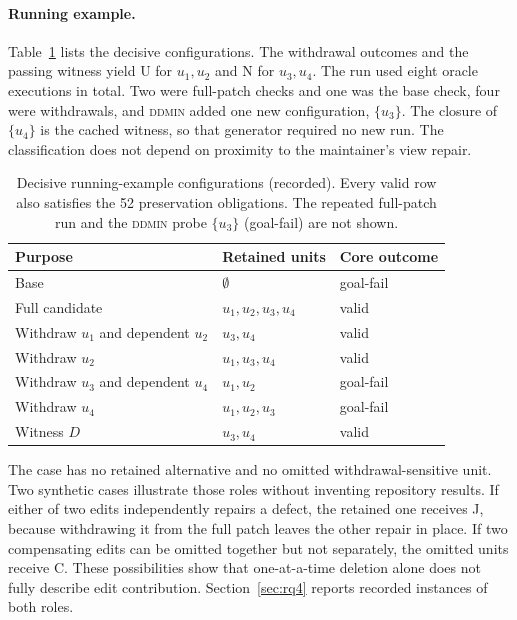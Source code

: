 \documentclass[a4paper,fleqn]{cas-sc}
\newcommand{\lab}[1]{\textsf{#1}}
\begin{document}
\paragraph{Running example.}
Table~\ref{tab:example} lists the decisive configurations. The withdrawal outcomes and the passing witness yield \lab{U} for $u_1,u_2$ and \lab{N} for $u_3,u_4$. The run used eight oracle executions in total. Two were full-patch checks and one was the base check, four were withdrawals, and \textsc{ddmin} added one new configuration, $\{u_3\}$. The closure of $\{u_4\}$ is the cached witness, so that generator required no new run. The classification does not depend on proximity to the maintainer's view repair.

\begin{table}[pos=htbp]
\caption{Decisive running-example configurations (recorded). Every valid row also satisfies the 52 preservation obligations. The repeated full-patch run and the \textsc{ddmin} probe $\{u_3\}$ (goal-fail) are not shown.}
\label{tab:example}
\centering\small
\begin{tabular}{lll}
\toprule
Purpose & Retained units & Core outcome \\
\midrule
Base & $\emptyset$ & goal-fail \\
Full candidate & $u_1,u_2,u_3,u_4$ & valid \\
Withdraw $u_1$ and dependent $u_2$ & $u_3,u_4$ & valid \\
Withdraw $u_2$ & $u_1,u_3,u_4$ & valid \\
Withdraw $u_3$ and dependent $u_4$ & $u_1,u_2$ & goal-fail \\
Withdraw $u_4$ & $u_1,u_2,u_3$ & goal-fail \\
Witness $D$ & $u_3,u_4$ & valid \\
\bottomrule
\end{tabular}
\end{table}

The case has no retained alternative and no omitted withdrawal-sensitive unit. Two synthetic cases illustrate those roles without inventing repository results. If either of two edits independently repairs a defect, the retained one receives \lab{J}, because withdrawing it from the full patch leaves the other repair in place. If two compensating edits can be omitted together but not separately, the omitted units receive \lab{C}. These possibilities show that one-at-a-time deletion alone does not fully describe edit contribution. Section~\ref{sec:rq4} reports recorded instances of both roles.
\end{document}
